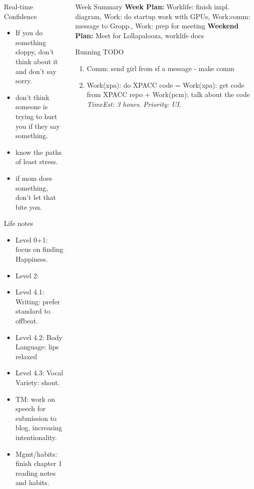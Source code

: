 \documentclass[serif, mathserif, final]{beamer}
\newcommand{\te}[1]{\textit{TimeEst:} \textit{#1}}
\newcommand{\prio}[1]{\textit{Priority:} \textit{#1}}
\begin{document}
\begin{frame}{}
\begin{columns}
\begin{column}{0.25\linewidth}
      \begin{block}{Real-time Confidence}
        \begin{itemize}
          \tiny \item \tiny If you do something sloppy, don't
          think about it and don't say sorry. 
        \item \tiny don't think someone is trying to hurt you if
          they say something.
        \item \tiny know the paths of least stress. 
        \item \tiny if mom does something, don't let that bite you. 
        \end{itemize}
      \end{block}
      
      \begin{block}{Life notes} 
        \begin{itemize} 
          \tiny \item \tiny Level 0+1: focus on finding Happiness. 
        \item \tiny Level 2: 
        \item \tiny Level 4.1: Writing: prefer standard to offbeat. 
        \item \tiny Level 4.2: Body Language: lips relaxed
        \item \tiny Level 4.3: Vocal Variety: shout. 
        \item \tiny TM: work on speech for submission to blog, increasing intentionality. 
        \item \tiny Mgmt/habits: finish chapter 1 reading notes and habits. 
        \end{itemize}     
      \end{block}
    \end{column} %
    
    \begin{column}{0.50\linewidth}
      \begin{block}{Week Summary}
        {\tiny \textbf{Week Plan:} Worklife: finish impl. diagram,
          Work: do startup work with GPUs, Work:comm: message to
          Gropp., Work: prep for meeting }
        {\tiny \textbf{Weekend Plan:} Meet for Lollapalooza, worklife docs} 
      \end{block} 

      \begin{block}{Running TODO} %
        \begin{enumerate} 
          \small \item \small Comm: send girl from sf a message - make comm  
        \item \small Work(xpa): do XPACC code = Work(xpa): get code
          from XPACC repo + Work(pcm): talk about the code \te{3
            hours}. \prio{UI}.


\end{enumerate}
\end{block}
\end{column}
\end{columns}
\end{frame}
\end{document}
